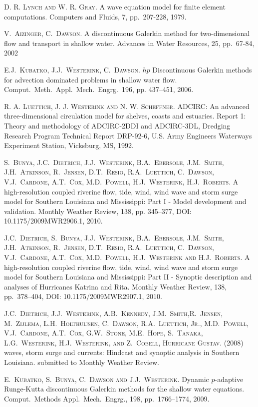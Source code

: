 
\begin{thebibliography}{10}
\textsc{D. R. Lynch and W. R. Gray}. {A wave equation model for finite element computations}. Computers and Fluids, 7, pp.\ 207-228, 1979.  

\textsc{V.~Aizinger, C.~Dawson}. {A discontinuous Galerkin method for two-dimensional flow and transport in shallow water}. Advances in Water Resources, 25, pp.\ 67-84, 2002

\textsc{E.J.~Kubatko, J.J.~Westerink, C.~Dawson}. {$hp$ Discontinuous Galerkin methods for advection dominated problems in shallow water flow}. Comput.~Meth.~Appl.~Mech.~Engrg.~196, pp. 437--451, 2006.

\textsc{R. A. Luettich, J. J. Westerink and N. W. Scheffner}. {ADCIRC: An advanced three-dimensional circulation model for shelves, coasts and estuaries}. Report 1: Theory and methodology of ADCIRC-2DDI and ADCIRC-3DL, Dredging Research Program Technical Report DRP-92-6, U.S. Army Engineers Waterways Experiment Station, Vicksburg, MS, 1992.  


\textsc{S.~Bunya, J.C.~Dietrich, J.J.~Westerink, B.A.~Ebersole, J.M.~Smith,  J.H.~Atkinson, R.~Jensen, D.T.~Resio, R.A.~Luettich, C.~Dawson, V.J.~Cardone, A.T.~Cox, M.D.~Powell, H.J.~Westerink, H.J.~Roberts}. {A high-resolution coupled riverine flow, tide, wind, wind wave and storm surge model for Southern Louisiana and Mississippi: Part I - Model development and validation}. Monthly Weather Review, 138, pp. 345--377, DOI: 10.1175/2009MWR2906.1, 2010.  


\textsc{J.C.~Dietrich, S.~Bunya, J.J.~Westerink, B.A.~Ebersole, J.M.~Smith,  J.H.~Atkinson, R.~Jensen, D.T.~Resio, R.A.~Luettich, C.~Dawson, V.J.~Cardone, A.T.~Cox, M.D.~Powell, H.J.~Westerink and H.J.~Roberts}. {A high-resolution coupled riverine flow, tide, wind, wind wave and storm surge model for Southern Louisiana and Mississippi: Part II - Synoptic description and analyses of Hurricanes Katrina and Rita}. Monthly Weather Review, 138, pp.\ 378--404, DOI: 10.1175/2009MWR2907.1, 2010.

\textsc{J.C.~Dietrich, J.J.~Westerink, A.B.~Kennedy, J.M.~Smith,R.~Jensen, M.~Zijlema, L.H.~Holthuijsen, C.~Dawson, R.A.~Luettich, Jr., M.D.~Powell, V.J.~Cardone, A.T.~Cox, G.W.~Stone, M.E.~Hope, S.~Tanaka, L.G.~Westerink, H.J.~Westerink, and Z.~Cobell, Hurricane Gustav}. {(2008) waves, storm surge and currents:  Hindcast and synoptic analysis in Southern Louisiana}. submitted to Monthly Weather Review.

\textsc{E.~Kubatko, S.~Bunya, C.~Dawson and J.J.~Westerink}. {Dynamic $p$-adaptive Runge-Kutta discontinuous Galerkin methods for the shallow water equations}. Comput.~Methods Appl.~Mech.~Engrg., 198, pp.\ 1766--1774, 2009.
\end{thebibliography}